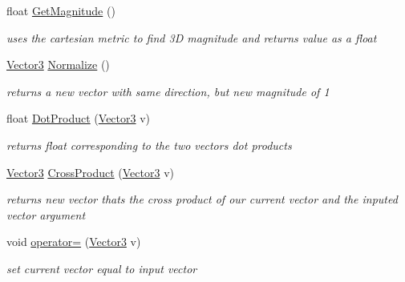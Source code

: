\begin{DoxyCompactItemize}
\mbox{\label{classVector3_aa9e0ca14708b98ed68f974df02ea797b}} 
float \hyperlink{classVector3_aa9e0ca14708b98ed68f974df02ea797b}{Get\+Magnitude} ()
\begin{DoxyCompactList}\small\item\em uses the cartesian metric to find 3D magnitude and returns value as a float \end{DoxyCompactList}\item 
\mbox{\label{classVector3_a8a8cb236aae8602af246f4f56495f159}} 
\hyperlink{classVector3}{Vector3} \hyperlink{classVector3_a8a8cb236aae8602af246f4f56495f159}{Normalize} ()
\begin{DoxyCompactList}\small\item\em returns a new vector with same direction, but new magnitude of 1 \end{DoxyCompactList}\item 
\mbox{\label{classVector3_ac1dcbe6eabbb2dad153b03b193942bbc}} 
float \hyperlink{classVector3_ac1dcbe6eabbb2dad153b03b193942bbc}{Dot\+Product} (\hyperlink{classVector3}{Vector3} v)
\begin{DoxyCompactList}\small\item\em returns float corresponding to the two vector\textquotesingle{}s dot products \end{DoxyCompactList}\item 
\mbox{\label{classVector3_ae00f95998612e0682d1a20eae1ccf5cf}} 
\hyperlink{classVector3}{Vector3} \hyperlink{classVector3_ae00f95998612e0682d1a20eae1ccf5cf}{Cross\+Product} (\hyperlink{classVector3}{Vector3} v)
\begin{DoxyCompactList}\small\item\em returns new vector that\textquotesingle{}s the cross product of our current vector and the inputed vector argument \end{DoxyCompactList}\item 
\mbox{\label{classVector3_a00c0f567fcfe5e64ed29fa1f2b62031b}} 
void \hyperlink{classVector3_a00c0f567fcfe5e64ed29fa1f2b62031b}{operator=} (\hyperlink{classVector3}{Vector3} v)
\begin{DoxyCompactList}\small\item\em set current vector equal to input vector \end{DoxyCompactList}\item 

\end{DoxyCompactItemize}

